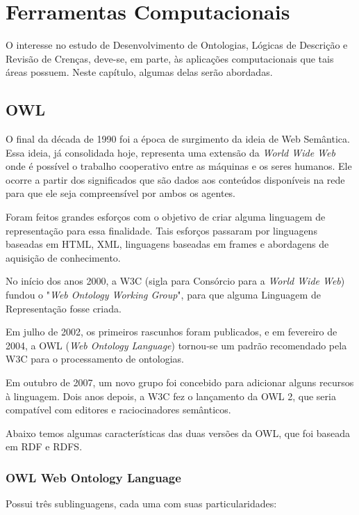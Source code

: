 \chapter{Ferramentas Computacionais}

\lettrine{O}{} interesse no estudo de Desenvolvimento de Ontologias, Lógicas de Descrição e Revisão de Crenças, deve-se, em parte, às aplicações computacionais que tais áreas possuem. Neste capítulo, algumas delas serão abordadas.

\section{OWL}

O final da década de 1990 foi a época de surgimento da ideia de Web Semântica. Essa ideia, já consolidada hoje, representa uma extensão da \textit{World Wide Web} onde é possível o trabalho cooperativo entre as máquinas e os seres humanos. Ele ocorre a partir dos significados que são dados aos conteúdos disponíveis na rede para que ele seja compreensível por ambos os agentes.

Foram feitos grandes esforços com o objetivo de criar alguma linguagem de representação para essa finalidade. Tais esforços passaram por linguagens baseadas em HTML, XML, linguagens baseadas em frames e abordagens de aquisição de conhecimento.

No início dos anos 2000, a W3C (sigla para Consórcio para a \textit{World Wide Web}) fundou o "\textit{Web Ontology Working Group}", para que alguma Linguagem de Representação fosse criada. 

Em julho de 2002, os primeiros rascunhos foram publicados, e em fevereiro de 2004, a OWL (\textit{Web Ontology Language}) tornou-se um padrão recomendado pela W3C para o processamento de ontologias.

Em outubro de 2007, um novo grupo foi concebido para adicionar alguns recursos à linguagem. Dois anos depois, a W3C fez o lançamento da OWL 2, que seria compatível com editores e raciocinadores semânticos.

Abaixo temos algumas características das duas versões da OWL, que foi baseada em RDF e RDFS.

\subsection{OWL Web Ontology Language}

Possui três sublinguagens, cada uma com suas particularidades:

